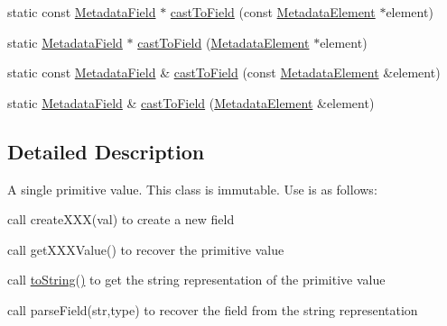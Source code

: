 \begin{DoxyCompactItemize}
static const \hyperlink{classBUSBOY_1_1MetadataField}{MetadataField} $\ast$ \hyperlink{classBUSBOY_1_1MetadataField_a8189df76bbc8f4437d1d5d8751b4d45b}{castToField} (const \hyperlink{classBUSBOY_1_1MetadataElement}{MetadataElement} $\ast$element)
\item 
static \hyperlink{classBUSBOY_1_1MetadataField}{MetadataField} $\ast$ \hyperlink{classBUSBOY_1_1MetadataField_a9cf4048adcafd51b26d8de1f730d82aa}{castToField} (\hyperlink{classBUSBOY_1_1MetadataElement}{MetadataElement} $\ast$element)
\item 
static const \hyperlink{classBUSBOY_1_1MetadataField}{MetadataField} \& \hyperlink{classBUSBOY_1_1MetadataField_a0f34beae96515d48486521a9f1ae3159}{castToField} (const \hyperlink{classBUSBOY_1_1MetadataElement}{MetadataElement} \&element)
\item 
static \hyperlink{classBUSBOY_1_1MetadataField}{MetadataField} \& \hyperlink{classBUSBOY_1_1MetadataField_a57c47e720ab8dd57d916c3cddf6aa420}{castToField} (\hyperlink{classBUSBOY_1_1MetadataElement}{MetadataElement} \&element)
\end{DoxyCompactItemize}


\subsection{Detailed Description}
A single primitive value. This class is immutable. Use is as follows:
\begin{DoxyItemize}
\item call createXXX(val) to create a new field
\item call getXXXValue() to recover the primitive value
\item call \hyperlink{classBUSBOY_1_1MetadataField_aaa19cf92f05e5cc4eb8fe2802f690b7d}{toString()} to get the string representation of the primitive value
\item call parseField(str,type) to recover the field from the string representation 
\end{DoxyItemize}

